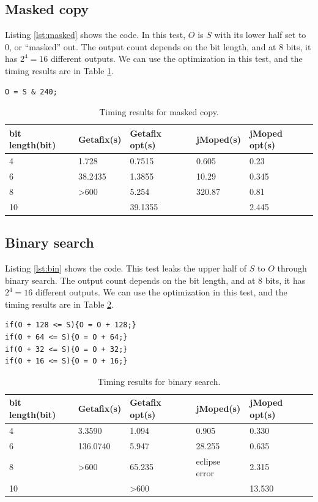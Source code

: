 \subsection{Masked copy}
Listing \ref{lst:masked} shows the code. In this test, $O$ is $S$ with its lower half set to $0$, or ``masked'' out. The output count depends on the bit length, and at $8$ bits, it has $2^{4} = 16$ different outputs. We can use the optimization in this test, and the timing results are in Table \ref{tbl:masked}.

\lstset{language=C}  
\begin{lstlisting}[float=h, caption={Masked copy test program at 8 bits.},label=lst:masked]
O = S & 240;
\end{lstlisting}

\begin{table}[htbp]
\begin{tabular}{|l|l|l|l|l|}
\hline
{bit length(bit)} & Getafix(s) & {Getafix opt(s)} & jMoped(s) & {jMoped opt(s)} \\ \hline
4 & 1.728 & 0.7515 & 0.605 & 0.23 \\ \hline
6 & 38.2435 & 1.3855 & 10.29 & 0.345 \\ \hline
8 & \textgreater 600 & 5.254 & 320.87 & 0.81 \\ \hline
10 &  & 39.1355 &  & 2.445 \\ \hline
\end{tabular}
\caption{Timing results for masked copy.}
\label{tbl:masked}
\end{table}

\subsection{Binary search}
Listing \ref{lst:bin} shows the code. This test leaks the upper half of $S$ to $O$ through binary search. The output count depends on the bit length, and at $8$ bits, it has $2^{4} = 16$ different outputs. We can use the optimization in this test, and the timing results are in Table \ref{tbl:bin}.

\lstset{language=C}  
\begin{lstlisting}[float=h, caption={Binary search test program at 8 bits.},label=lst:bin]
if(O + 128 <= S){O = O + 128;}
if(O + 64 <= S){O = O + 64;}
if(O + 32 <= S){O = O + 32;}
if(O + 16 <= S){O = O + 16;}
\end{lstlisting}

\begin{table}[htbp]
\begin{tabular}{|l|l|l|l|l|}
\hline
{bit length(bit)} & Getafix(s) & {Getafix opt(s)} & jMoped(s) & {jMoped opt(s)} \\ \hline
4 & 3.3590 & 1.094 & 0.905 & 0.330 \\ \hline
6 & 136.0740 & 5.947 & 28.255 & 0.635 \\ \hline
8 & \textgreater 600 & 65.235 & eclipse error & 2.315 \\ \hline
10 &  & \textgreater 600 &  & 13.530 \\ \hline
\end{tabular}
\caption{Timing results for binary search.}
\label{tbl:bin}
\end{table}

